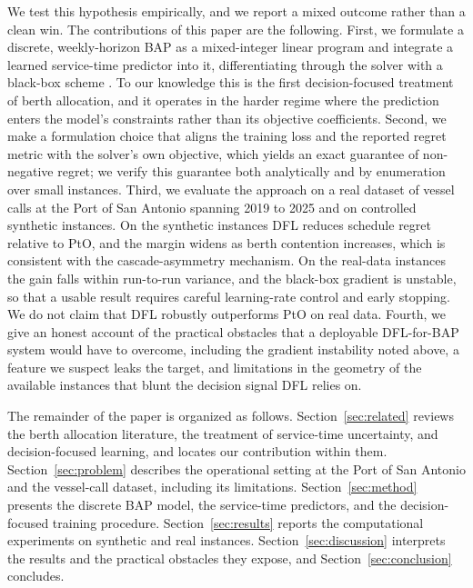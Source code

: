 We test this hypothesis empirically, and we report a mixed outcome rather than a
clean win. The contributions of this paper are the following. First, we
formulate a discrete, weekly-horizon BAP as a mixed-integer linear program and
integrate a learned service-time predictor into it, differentiating through the
solver with a black-box scheme
\citep{pogancic2020blackbox,berthet2020learning,tang2024pyepo}. To our
knowledge this is the first decision-focused treatment of berth allocation, and
it operates in the harder regime where the prediction enters the model's
constraints rather than its objective coefficients. Second, we make a
formulation choice that aligns the training loss and the reported regret metric
with the solver's own objective, which yields an exact guarantee of
non-negative regret; we verify this guarantee both analytically and by
enumeration over small instances. Third, we evaluate the approach on a real
dataset of vessel calls at the Port of San Antonio spanning 2019 to 2025 and on
controlled synthetic instances. On the synthetic instances DFL reduces schedule
regret relative to PtO, and the margin widens as berth contention increases,
which is consistent with the cascade-asymmetry mechanism. On the real-data
instances the gain falls within run-to-run variance, and the black-box gradient
is unstable, so that a usable result requires careful learning-rate control and
early stopping. We do not claim that DFL robustly outperforms PtO on real data.
Fourth, we give an honest account of the practical obstacles that a deployable
DFL-for-BAP system would have to overcome, including the gradient instability
noted above, a feature we suspect leaks the target, and limitations in the
geometry of the available instances that blunt the decision signal DFL relies
on.

The remainder of the paper is organized as follows. Section~\ref{sec:related}
reviews the berth allocation literature, the treatment of service-time
uncertainty, and decision-focused learning, and locates our contribution within
them. Section~\ref{sec:problem} describes the operational setting at the Port of
San Antonio and the vessel-call dataset, including its limitations.
Section~\ref{sec:method} presents the discrete BAP model, the service-time
predictors, and the decision-focused training procedure.
Section~\ref{sec:results} reports the computational experiments on synthetic and
real instances. Section~\ref{sec:discussion} interprets the results and the
practical obstacles they expose, and Section~\ref{sec:conclusion} concludes.
